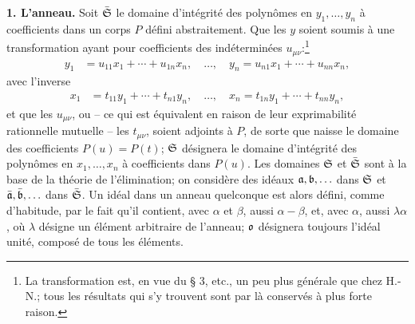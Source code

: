 \textbf{1. L'anneau.} Soit $\bar{\mathfrak S}$ le domaine d'intégrité des polynômes en $y_1,\ldots,y_n$ à coefficients dans un corps $P$ défini abstraitement. Que les $y$ soient soumis à une transformation ayant pour coefficients des indéterminées $u_{\mu\nu}$:\footnote{La transformation est, en vue du \S{} 3, etc., un peu plus générale que chez H.-N.; tous les résultats qui s'y trouvent sont par là conservés à plus forte raison.}
\begin{align}
 y_1&=u_{11}x_1+\cdots+u_{1n}x_n,\quad \ldots,\quad
 y_n=u_{n1}x_1+\cdots+u_{nn}x_n, \tag{1}
\end{align}
avec l'inverse
\begin{align}
 x_1&=t_{11}y_1+\cdots+t_{n1}y_n,\quad \ldots,\quad
 x_n=t_{1n}y_1+\cdots+t_{nn}y_n, \tag{1'}
\end{align}
et que les $u_{\mu\nu}$, ou -- ce qui est équivalent en raison de leur exprimabilité rationnelle mutuelle -- les $t_{\mu\nu}$, soient adjoints à $P$, de sorte que naisse le domaine des coefficients $P(u)=P(t)$; $\mathfrak S$ désignera le domaine d'intégrité des polynômes en $x_1,\ldots,x_n$ à coefficients dans $P(u)$. Les domaines $\mathfrak S$ et $\bar{\mathfrak S}$ sont à la base de la théorie de l'élimination; on considère des idéaux $\mathfrak a,\mathfrak b,\ldots$ dans $\mathfrak S$ et $\bar{\mathfrak a},\bar{\mathfrak b},\ldots$ dans $\bar{\mathfrak S}$. Un idéal dans un anneau quelconque est alors défini, comme d'habitude, par le fait qu'il contient, avec $\alpha$ et $\beta$, aussi $\alpha-\beta$, et, avec $\alpha$, aussi $\lambda\alpha$, où $\lambda$ désigne un élément arbitraire de l'anneau; $\mathfrak o$ désignera toujours l'idéal unité, composé de tous les éléments.

